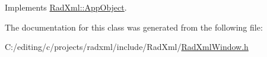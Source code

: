 Implements \hyperlink{class_rad_xml_1_1_app_object_a677e0af301973343665699f6d07f2018}{Rad\-Xml\-::\-App\-Object}.



The documentation for this class was generated from the following file\-:\begin{DoxyCompactItemize}
\item 
C\-:/editing/c/projects/radxml/include/\-Rad\-Xml/\hyperlink{_rad_xml_window_8h}{Rad\-Xml\-Window.\-h}\end{DoxyCompactItemize}
